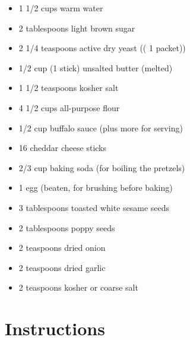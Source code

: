 \documentclass[
  letterpaper,
  DIV=11,
  numbers=noendperiod,
  titlepage=false]{scrreprt}
\providecommand{\tightlist}{%
  \setlength{\itemsep}{0pt}\setlength{\parskip}{0pt}}\usepackage{longtable,booktabs,array}
\begin{document}
\begin{itemize}
\tightlist
\item
  1 1/2 cups warm water
\item
  2 tablespoons light brown sugar
\item
  2 1/4 teaspoons active dry yeast (( 1 packet))
\item
  1/2 cup (1 stick) unsalted butter (melted)
\item
  1 1/2 teaspoons kosher salt
\item
  4 1/2 cups all-purpose flour
\item
  1/2 cup buffalo sauce (plus more for serving)
\item
  16 cheddar cheese sticks
\item
  2/3 cup baking soda (for boiling the pretzels)
\item
  1 egg (beaten, for brushing before baking)
\item
  3 tablespoons toasted white sesame seeds
\item
  2 tablespoons poppy seeds
\item
  2 teaspoons dried onion
\item
  2 teaspoons dried garlic
\item
  2 teaspoons kosher or coarse salt
\end{itemize}

\section{Instructions}\label{instructions-144}
\end{document}
